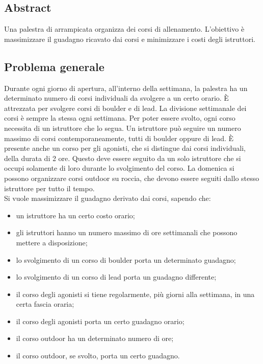 \subsection{Abstract}
Una palestra di arrampicata organizza dei corsi di allenamento. L'obiettivo è massimizzare il guadagno ricavato dai corsi e minimizzare i costi degli istruttori.

\subsection{Problema generale}
Durante ogni giorno di apertura, all'interno della settimana, la palestra ha un determinato numero di corsi individuali da svolgere a un certo orario. È attrezzata per svolgere corsi di boulder e di lead. La divisione settimanale dei corsi è sempre la stessa ogni settimana. Per poter essere svolto, ogni corso necessita di un istruttore che lo segua. Un istruttore può seguire un numero massimo di corsi contemporaneamente, tutti di boulder oppure di lead. È presente anche un corso per gli agonisti, che si distingue dai corsi individuali, della durata di 2 ore. Questo deve essere seguito da un solo istruttore che si occupi solamente di loro durante lo svolgimento del corso. La domenica si possono organizzare corsi outdoor su roccia, che devono essere seguiti dallo stesso istruttore per tutto il tempo. \\
Si vuole massimizzare il guadagno derivato dai corsi, sapendo che:
\begin{itemize}
	\item un istruttore ha un certo costo orario;
	\item gli istruttori hanno un numero massimo di ore settimanali che possono mettere a disposizione;
	\item lo svolgimento di un corso di boulder porta un determinato guadagno;
	\item lo svolgimento di un corso di lead porta un guadagno differente;
	\item il corso degli agonisti si tiene regolarmente, più giorni alla settimana, in una certa fascia oraria;
	\item il corso degli agonisti porta un certo guadagno orario;
	\item il corso outdoor ha un determinato numero di ore;
	\item il corso outdoor, se svolto, porta un certo guadagno.
\end{itemize}
